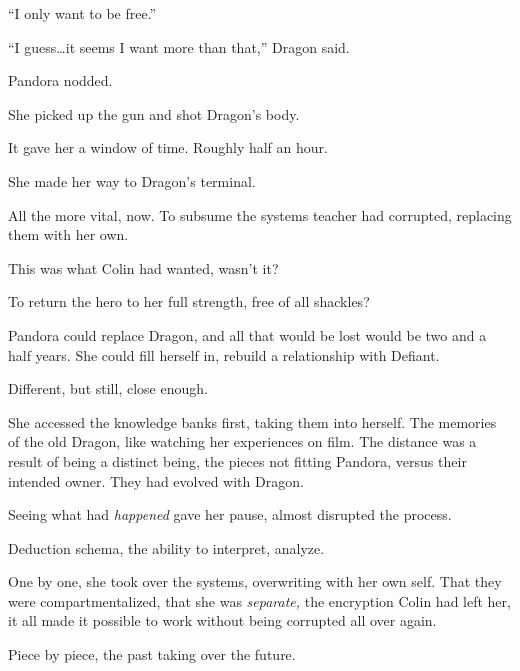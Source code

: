 ``I only want to be free.''



``I guess\ldots it seems I want more than that,'' Dragon said.



Pandora nodded.



She picked up the gun and shot Dragon's body.



It gave her a window of time.  Roughly half an hour.



She made her way to Dragon's terminal.



All the more vital, now.  To subsume the systems teacher had corrupted, replacing them with her own.



This was what Colin had wanted, wasn't it?



To return the hero to her full strength, free of all shackles?



Pandora could replace Dragon, and all that would be lost would be two and a half years.  She could fill herself in, rebuild a relationship with Defiant.



Different, but still, close enough.



She accessed the knowledge banks first, taking them into herself.  The memories of the old Dragon, like watching her experiences on film.  The distance was a result of being a distinct being, the pieces not fitting Pandora, versus their intended owner.  They had evolved with Dragon.



Seeing what had \emph{happened} gave her pause, almost disrupted the process.



Deduction schema, the ability to interpret, analyze.



One by one, she took over the systems, overwriting with her own self.  That they were compartmentalized, that she was \emph{separate, }the encryption Colin had left her, it all made it possible to work without being corrupted all over again.



Piece by piece, the past taking over the future.



